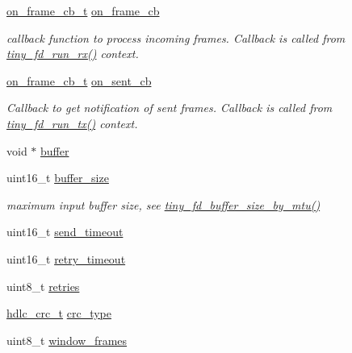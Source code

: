 \begin{DoxyCompactItemize}
\hyperlink{tiny__types_8h_ad6bf709565b8aecb9e6ecf196f219d54}{on\+\_\+frame\+\_\+cb\+\_\+t} \hyperlink{structtiny__fd__init__t___a437d94ac2f58ea83f510e0a35733f3a1}{on\+\_\+frame\+\_\+cb}
\begin{DoxyCompactList}\small\item\em callback function to process incoming frames. Callback is called from \hyperlink{group__FULL__DUPLEX__API_gad31f944514aef01e27bc3ec67fdbe140}{tiny\+\_\+fd\+\_\+run\+\_\+rx()} context. \end{DoxyCompactList}\item 
\mbox{\label{structtiny__fd__init__t___ab256903ac157e22647dc37d4aee6a986}} 
\hyperlink{tiny__types_8h_ad6bf709565b8aecb9e6ecf196f219d54}{on\+\_\+frame\+\_\+cb\+\_\+t} \hyperlink{structtiny__fd__init__t___ab256903ac157e22647dc37d4aee6a986}{on\+\_\+sent\+\_\+cb}
\begin{DoxyCompactList}\small\item\em Callback to get notification of sent frames. Callback is called from \hyperlink{group__FULL__DUPLEX__API_ga601c9874a570331580856c1ea28f7914}{tiny\+\_\+fd\+\_\+run\+\_\+tx()} context. \end{DoxyCompactList}\item 
void $\ast$ \hyperlink{structtiny__fd__init__t___a9a82b8c6c060dbc17022a0c902d436f2}{buffer}
\item 
\mbox{\label{structtiny__fd__init__t___af76a7f851dc110e5c3f506f66ae91320}} 
uint16\+\_\+t \hyperlink{structtiny__fd__init__t___af76a7f851dc110e5c3f506f66ae91320}{buffer\+\_\+size}
\begin{DoxyCompactList}\small\item\em maximum input buffer size, see \hyperlink{group__FULL__DUPLEX__API_ga19789bea5b5acd68804773f0d6b0e3f7}{tiny\+\_\+fd\+\_\+buffer\+\_\+size\+\_\+by\+\_\+mtu()} \end{DoxyCompactList}\item 
uint16\+\_\+t \hyperlink{structtiny__fd__init__t___ae6653af324c07711c4b20360760c3e3a}{send\+\_\+timeout}
\item 
uint16\+\_\+t \hyperlink{structtiny__fd__init__t___a54b9c689fba5aae8ccc0c29f05a159ca}{retry\+\_\+timeout}
\item 
uint8\+\_\+t \hyperlink{structtiny__fd__init__t___ae366ae6e7626b0d92a6e5088c29169cd}{retries}
\item 
\hyperlink{group__HDLC__API_gabb73b32d08d8e79eefe9385634a74bf7}{hdlc\+\_\+crc\+\_\+t} \hyperlink{structtiny__fd__init__t___ac69d819ccec020c8382eee492070a85a}{crc\+\_\+type}
\item 
uint8\+\_\+t \hyperlink{structtiny__fd__init__t___ae4da012c3e39c4e7dda587191b4c2f77}{window\+\_\+frames}
\end{DoxyCompactItemize}


